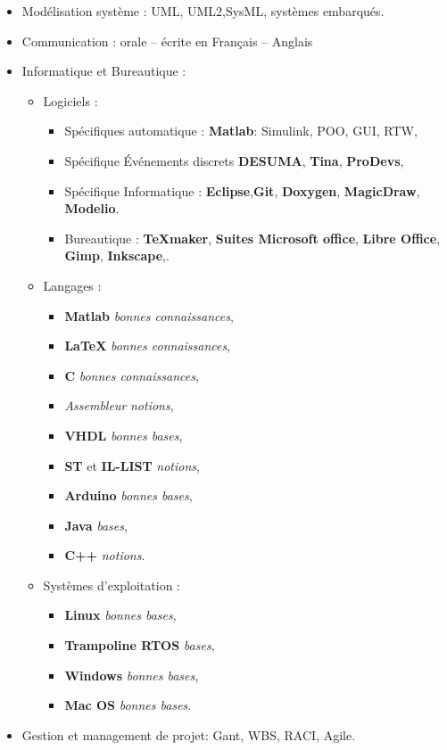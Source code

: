 \documentclass{article}
\begin{document}
\begin{itemize}
\begin{itemize}
	\end{itemize}
\item Modélisation système : UML, UML2,SysML, systèmes embarqués.

\item Communication : orale -- écrite en Français -- Anglais

\item Informatique et Bureautique : 
	\begin{itemize}
	\item Logiciels : 
		\begin{itemize}
		\item Spécifiques automatique : \textbf{Matlab}: Simulink, POO, GUI, RTW, 
		\item Spécifique Événements discrets  \textbf{DESUMA}, \textbf{Tina}, \textbf{ProDevs}, 
		\item Spécifique Informatique : \textbf{Eclipse},\textbf{Git}, \textbf{Doxygen}, \textbf{MagicDraw}, \textbf{Modelio}.
		\item Bureautique : \textbf{\TeX maker}, \textbf{Suites Microsoft office}, \textbf{Libre Office}, \textbf{Gimp}, \textbf{Inkscape},.
		\end{itemize}
	
	\item Langages : 
		\begin{itemize}
		\item 	\textbf{Matlab} \textit{bonnes connaissances}, 
		\item \textbf{\LaTeX}  \textit{bonnes connaissances},
		\item \textbf{C} \textit{bonnes connaissances}, 
		\item \textit{Assembleur} \textit{notions},
		\item \textbf{VHDL} \textit{bonnes bases}, 
		\item \textbf{ST} et \textbf{IL-LIST} \textit{notions}, 
		\item \textbf{Arduino} \textit{bonnes bases},
		\item \textbf{Java} \textit{bases}, 		
		\item \textbf{C++} \textit{notions}.
		\end{itemize}
		
	\item Systèmes d'exploitation :
		\begin{itemize}
		\item \textbf{Linux} \textit{bonnes bases},
		\item \textbf{Trampoline RTOS} \textit{bases}, 
		\item \textbf{Windows} \textit{bonnes bases},
		\item \textbf{Mac OS} \textit{bonnes bases}.
		\end{itemize}
	\end{itemize}		
\item Gestion et management de projet: Gant, WBS, RACI, Agile.

\end{itemize}
\end{document}
